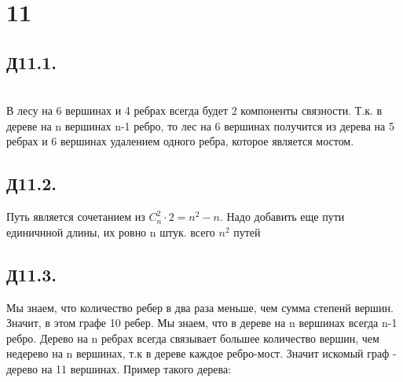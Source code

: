 

	\section*{11}
	\subsection*{Д11.1.}
	 \quad
		 \\
	В лесу на 6 вершинах и 4 ребрах всегда будет 2 компоненты связности. Т.к. в дереве на n вершинах n-1 ребро, то лес на 6 вершинах получится из дерева на 5 ребрах и 6 вершинах удалением одного ребра, которое является мостом.
	\subsection*{Д11.2.}
	Путь является  сочетанием из $C_n^2\cdot2 = n^2-n$. Надо добавить еще пути единичнной длины, их ровно n штук. всего $n^2$ путей \\
 
	\subsection*{Д11.3.}
	Мы знаем, что количество ребер в два раза меньше, чем сумма степенй вершин. Значит, в этом графе 10 ребер. Мы знаем, что в дереве на n вершинах всегда n-1 ребро. Дерево на n ребрах всегда связывает большее количество вершин, чем недерево на n вершинах, т.к в дереве каждое ребро-мост. Значит искомый граф - дерево на 11 вершинах. 
	Пример такого дерева:  \\

